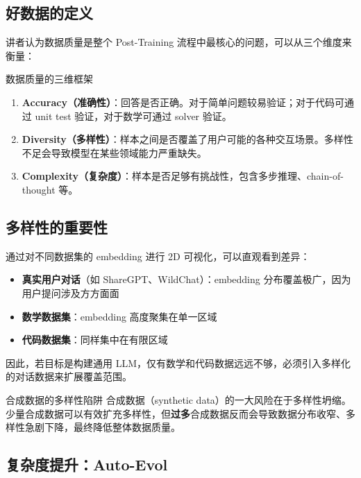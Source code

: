 \documentclass[a4paper]{article}
\begin{document}
\subsection{好数据的定义}

讲者认为数据质量是整个 Post-Training 流程中最核心的问题，可以从三个维度来衡量：

\begin{importantbox}{数据质量的三维框架}
\begin{enumerate}
    \item \textbf{Accuracy（准确性）}：回答是否正确。对于简单问题较易验证；对于代码可通过 unit test 验证，对于数学可通过 solver 验证。
    \item \textbf{Diversity（多样性）}：样本之间是否覆盖了用户可能的各种交互场景。多样性不足会导致模型在某些领域能力严重缺失。
    \item \textbf{Complexity（复杂度）}：样本是否足够有挑战性，包含多步推理、chain-of-thought 等。
\end{enumerate}
\end{importantbox}

\subsection{多样性的重要性}

通过对不同数据集的 embedding 进行 2D 可视化，可以直观看到差异：

\begin{itemize}
    \item \textbf{真实用户对话}（如 ShareGPT、WildChat）：embedding 分布覆盖极广，因为用户提问涉及方方面面
    \item \textbf{数学数据集}：embedding 高度聚集在单一区域
    \item \textbf{代码数据集}：同样集中在有限区域
\end{itemize}

因此，若目标是构建通用 LLM，仅有数学和代码数据远远不够，必须引入多样化的对话数据来扩展覆盖范围。

\begin{warningbox}{合成数据的多样性陷阱}
合成数据（synthetic data）的一大风险在于多样性坍缩。少量合成数据可以有效扩充多样性，但\textbf{过多}合成数据反而会导致数据分布收窄、多样性急剧下降，最终降低整体数据质量。
\end{warningbox}

\subsection{复杂度提升：Auto-Evol}
\end{document}
